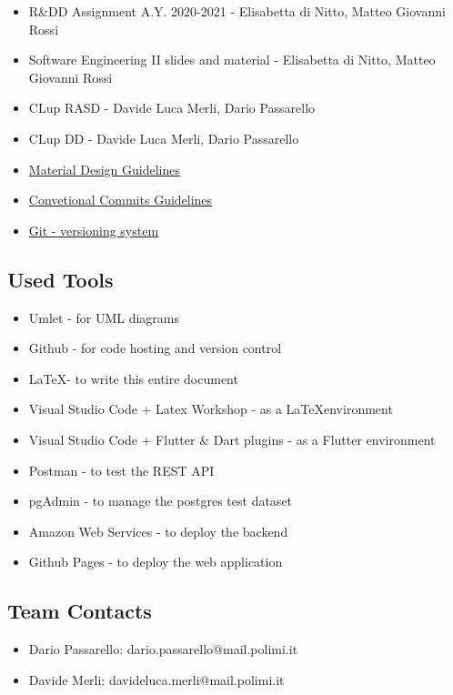 \begin{itemize}
    \item R\&DD Assignment A.Y. 2020-2021 - Elisabetta di Nitto, Matteo Giovanni Rossi
    \item Software Engineering II slides and material - Elisabetta di Nitto, Matteo Giovanni Rossi
    \item CLup RASD - Davide Luca Merli, Dario Passarello
    \item CLup DD - Davide Luca Merli, Dario Passarello
    \item \href{https://material.io/design}{Material Design Guidelines}
    \item \href{https://www.conventionalcommits.org/en/v1.0.0/}{Convetional Commits Guidelines}
    \item \href{https://git-scm.com/}{Git - versioning system}
\end{itemize}

\subsection{Used Tools}
\begin{itemize}
    \item Umlet - for UML diagrams
    \item Github - for code hosting and version control
    \item \LaTeX \space  - to write this entire document
    \item Visual Studio Code + Latex Workshop - as a \LaTeX \space environment
    \item Visual Studio Code + Flutter \& Dart plugins - as a Flutter environment
    \item Postman - to test the REST API
    \item pgAdmin - to manage the postgres test dataset
    \item Amazon Web Services - to deploy the backend
    \item Github Pages - to deploy the web application
\end{itemize}

\subsection{Team Contacts}
\begin{itemize}
    \item Dario Passarello: dario.passarello@mail.polimi.it
    \item Davide Merli: davideluca.merli@mail.polimi.it
\end{itemize}

\clearpage